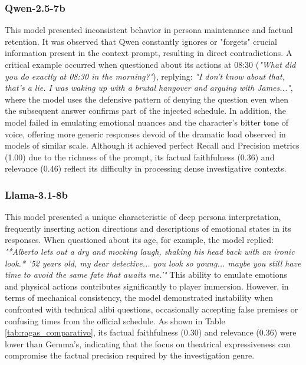 \documentclass[12pt]{article}
\begin{document}
\subsubsection{Qwen-2.5-7b}
This model presented inconsistent behavior in persona maintenance and factual retention. It was observed that Qwen constantly ignores or "forgets" crucial information present in the context prompt, resulting in direct contradictions. A critical example occurred when questioned about its actions at 08:30 (\textit{"What did you do exactly at 08:30 in the morning?"}), replying: \textit{"I don't know about that, that's a lie. I was waking up with a brutal hangover and arguing with James..."}, where the model uses the defensive pattern of denying the question even when the subsequent answer confirms part of the injected schedule. In addition, the model failed in emulating emotional nuances and the character's bitter tone of voice, offering more generic responses devoid of the dramatic load observed in models of similar scale. Although it achieved perfect Recall and Precision metrics (1.00) due to the richness of the prompt, its factual faithfulness (0.36) and relevance (0.46) reflect its difficulty in processing dense investigative contexts.

\subsubsection{Llama-3.1-8b}
This model presented a unique characteristic of deep persona interpretation, frequently inserting action directions and descriptions of emotional states in its responses. When questioned about its age, for example, the model replied: \textit{"*Alberto lets out a dry and mocking laugh, shaking his head back with an ironic look.* '52 years old, my dear detective... you look so young... maybe you still have time to avoid the same fate that awaits me.'"} This ability to emulate emotions and physical actions contributes significantly to player immersion. However, in terms of mechanical consistency, the model demonstrated instability when confronted with technical alibi questions, occasionally accepting false premises or confusing times from the official schedule. As shown in Table \ref{tab:ragas_comparativo}, its factual faithfulness (0.30) and relevance (0.36) were lower than Gemma's, indicating that the focus on theatrical expressiveness can compromise the factual precision required by the investigation genre.
\end{document}
